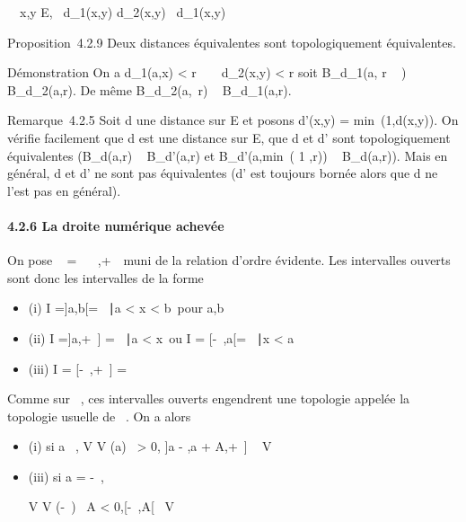 \documentclass[]{article}
\begin{document}
\forall~~x,y \in E,\quad
\alpha~d_1(x,y) \leq d_2(x,y) \leq \beta~d_1(x,y)

Proposition~4.2.9 Deux distances équivalentes sont topologiquement
équivalentes.

Démonstration On a d_1(a,x) < r
\over \beta~ \rigtharrow~ d_2(x,y) < r soit
B_d_1(a, r \over \beta~ ) \subset~
B_d_2(a,r). De même B_d_2(a,\alpha~r) \subset~
B_d_1(a,r).

Remarque~4.2.5 Soit d une distance sur E et posons d'(x,y)
= min~(1,d(x,y)). On vérifie facilement que d
est une distance sur E, que d et d' sont topologiquement équivalentes
(B_d(a,r) \subset~ B_d'(a,r) et
B_d'(a,min~( 1  ,r)) \subset~ B_d(a,r)). Mais en général, d et d' ne sont pas
équivalentes (d' est toujours bornée alors que d ne l'est pas en
général).

\paragraph{4.2.6 La droite numérique achevée}

On pose \overline{}~ = ~
\cup\-\infty~,+\infty~\ muni de la relation d'ordre
évidente. Les intervalles ouverts sont donc les intervalles de la forme

\begin{itemize}
\itemsep1pt\parskip0pt
\item
  (i) I =]a,b[= \x \in {}~∣a
  < x < b\ pour a,b
  \in\overline{}~
\item
  (ii) I =]a,+\infty~] = \x
  \in\overline{}~∣a
  < x\ ou I = [-\infty~,a[= \x
  \in\overline{}~∣x
  < a\
\item
  (iii) I = [-\infty~,+\infty~] = \overline{}~
\end{itemize}

Comme sur ~, ces intervalles ouverts engendrent une topologie appelée la
topologie usuelle de \overline\mathbb{R}~. On a alors

\begin{itemize}
\item
  (i) si a \in {}~, V \in V (a) \Leftrightarrow
  \exists~\epsilon > 0,\quad
  ]a - \epsilon,a + \epsilon[\subset~ V
\item
  (ii) si a = +\infty~,

  V \in V (+\infty~) \Leftrightarrow \exists~A
  > 0,\quad ]A,+\infty~] \subset~ V
\item
  (iii) si a = -\infty~,

  V \in V (-\infty~) \Leftrightarrow \exists~A
  < 0,\quad [-\infty~,A[\subset~ V
\end{itemize}
\end{document}
